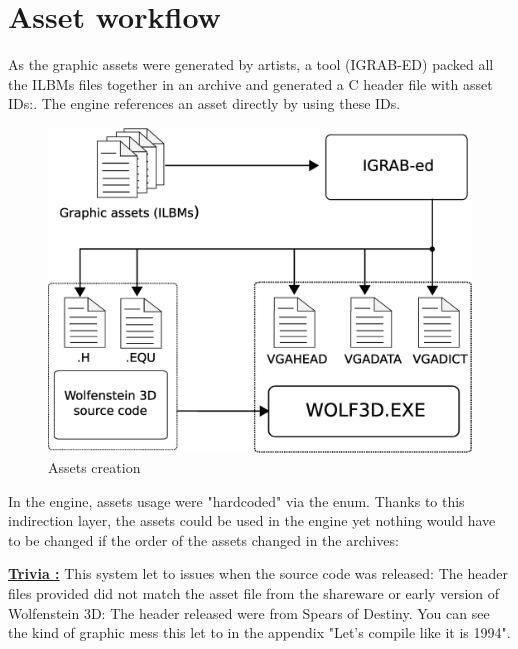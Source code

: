 \documentclass[book.tex]{subfiles}
\begin{document}
\section{Asset workflow}
As the graphic assets were generated by artists, a tool (IGRAB-ED) packed all the ILBMs files together in an archive and generated a C header file with asset IDs:. The engine references an asset directly by using these IDs.\\
\begin{figure}[H]
\centering
 \includegraphics[width=\textwidth]{imgs/drawings/drawing_plain.eps}
 \caption{Assets creation} 
 \end{figure}

\begin{minipage}{\textwidth}
 \par
 \end{minipage}
 
 In the engine, assets usage were "hardcoded" via the enum. Thanks to this indirection layer, the assets could be used in the engine yet nothing would have to be changed if the order of the assets changed in the  archives:\\
 \par
 \begin{minipage}{\textwidth}
 \par
 \end{minipage}
\par
\textbf{\underline{Trivia :}} This system let to issues when the source code was released: The  header files provided did not match the asset file from the shareware or early version of Wolfenstein 3D: The header released were from Spears of Destiny. You can see the kind of graphic mess this let to in the appendix "Let's compile like it is 1994".\\
\end{document}
